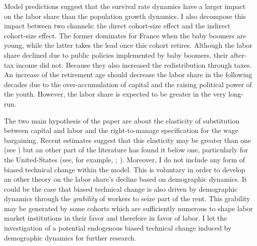 
Model predictions suggest that the survival rate dynamics have a larger impact on the labor share than the population growth dynamics. I also decompose this impact between two channels: the direct cohort-size effect and the indirect cohort-size effect. The former dominates for France when the baby boomers are young, while the latter takes the lead once this cohort retires. Although the labor share declined due to public policies implemented by baby boomers, their after-tax income did not. Because they also increased the redistribution through taxes. An increase of the retirement age should decrease the labor share in the following decades due to the over-accumulation of capital and the raising political power of the youth. However, the labor share is expected to be greater in the very long-run.

The two main hypothesis of the paper are about the elasticity of substitution between capital and labor and the right-to-manage specification for the wage bargaining. Recent estimates suggest that this elasticity may be greater than one (see \citealt{Karabarbounis2014}) but an other part of the literature has found it below one, particularly for the United-States (see, for example, \citealt{Antras2004}; \citealt{Chirinko2008}). Moreover, I do not include any form of biased technical change within the model. This is voluntary in order to develop an other theory on the labor share's decline based on demographic dynamics. It could be the case that biased technical change is also driven by demographic dynamics through the \textit{grability} of workers to seize part of the rent. This grability may be generated by some cohorts which are sufficiently numerous to shape labor market institutions in their favor and therefore in favor of labor. I let the investigation of a potential endogenous biased technical change induced by demographic dynamics for further research.





